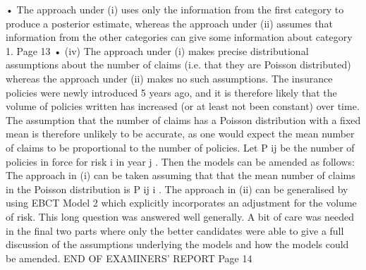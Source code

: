 • The approach under (i) uses only the information from the first category to
produce a posterior estimate, whereas the approach under (ii) assumes that
information from the other categories can give some information about
category 1.
Page 13%
•
(iv)
The approach under (i) makes precise distributional assumptions about the number of claims (i.e. that they are Poisson distributed) whereas the
approach under (ii) makes no such assumptions.
The insurance policies were newly introduced 5 years ago, and it is therefore
likely that the volume of policies written has increased (or at least not been
constant) over time. The assumption that the number of claims has a Poisson
distribution with a fixed mean is therefore unlikely to be accurate, as one
would expect the mean number of claims to be proportional to the number of
policies.
Let P ij be the number of policies in force for risk i in year j . Then the models
can be amended as follows:
The approach in (i) can be taken assuming that that the mean number of claims
in the Poisson distribution is P ij \theta  i .
The approach in (ii) can be generalised by using EBCT Model 2 which
explicitly incorporates an adjustment for the volume of risk.
This long question was answered well generally. A bit of care was needed in the final two
parts where only the better candidates were able to give a full discussion of the assumptions
underlying the models and how the models could be amended.
END OF EXAMINERS’ REPORT
Page 14
